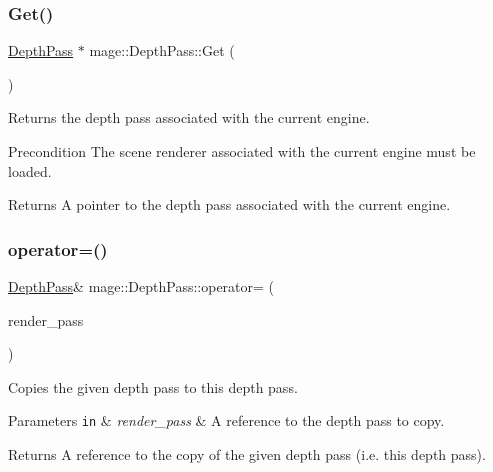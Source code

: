 \subsubsection{\texorpdfstring{Get()}{Get()}}
{\footnotesize\ttfamily \hyperlink{classmage_1_1_depth_pass}{Depth\+Pass} $\ast$ mage\+::\+Depth\+Pass\+::\+Get (\begin{DoxyParamCaption}{ }\end{DoxyParamCaption})\hspace{0.3cm}{\ttfamily [static]}}

Returns the depth pass associated with the current engine.

\begin{DoxyPrecond}{Precondition}
The scene renderer associated with the current engine must be loaded. 
\end{DoxyPrecond}
\begin{DoxyReturn}{Returns}
A pointer to the depth pass associated with the current engine. 
\end{DoxyReturn}
\hypertarget{classmage_1_1_depth_pass_ac84074238d8ce69251fc2e6f294c5898}{}\label{classmage_1_1_depth_pass_ac84074238d8ce69251fc2e6f294c5898} 
\subsubsection{\texorpdfstring{operator=()}{operator=()}\hspace{0.1cm}{\footnotesize\ttfamily [1/2]}}
{\footnotesize\ttfamily \hyperlink{classmage_1_1_depth_pass}{Depth\+Pass}\& mage\+::\+Depth\+Pass\+::operator= (\begin{DoxyParamCaption}\item[{const \hyperlink{classmage_1_1_depth_pass}{Depth\+Pass} \&}]{render\+\_\+pass }\end{DoxyParamCaption})\hspace{0.3cm}{\ttfamily [delete]}}

Copies the given depth pass to this depth pass.


\begin{DoxyParams}[1]{Parameters}
\mbox{\tt in}  & {\em render\+\_\+pass} & A reference to the depth pass to copy. \\
\hline
\end{DoxyParams}
\begin{DoxyReturn}{Returns}
A reference to the copy of the given depth pass (i.\+e. this depth pass). 
\end{DoxyReturn}
\hypertarget{classmage_1_1_depth_pass_ab6a7d2abf0876f84591328d448ac1203}{}\label{classmage_1_1_depth_pass_ab6a7d2abf0876f84591328d448ac1203} 
